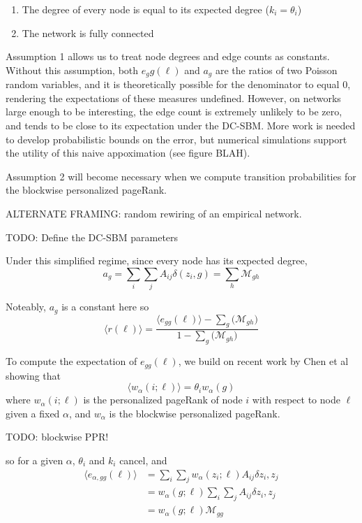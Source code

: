 \documentclass[12pt]{article}
\begin{document}
\begin{enumerate}
  \item The degree of every node is equal to its expected degree ($k_i = \theta_i$)
  \item The network is fully connected
\end{enumerate}

Assumption 1 allows us to treat node degrees and edge counts as constants.  Without this assumption, both $e_gg(\ell)$ and $a_g$ are the ratios of two Poisson random variables, and it is theoretically possible for the denominator to equal 0, rendering the expectations of these measures undefined.  However, on networks large enough to be interesting, the edge count is extremely unlikely to be zero, and tends to be close to its expectation under the DC-SBM.  More work is needed to develop probabilistic bounds on the error, but numerical simulations support the utility of this naive appoximation (see figure BLAH).    

Assumption 2 will become necessary when we compute transition probabilities for the blockwise personalized pageRank. 

ALTERNATE FRAMING: random rewiring of an empirical network.

TODO: Define the DC-SBM parameters

Under this simplified regime, since every node has its expected degree,
\begin{equation}
  a_g = \sum_i \sum_j A_{ij} \delta(z_i, g) = \sum_h \mathcal{M}_{gh}
\end{equation}

Noteably, $a_g$ is a constant here so 
\begin{equation}
  \langle r(\ell) \rangle = \frac{\langle e_{gg}(\ell) \rangle - \sum_g \big( \mathcal{M}_{gh} \big)}{1 - \sum_g \big( \mathcal{M}_{gh} \big)}
\end{equation}

To compute the expectation of $e_{gg}(\ell)$, we build on recent work by Chen et al \cite{chen:2020} showing that
\begin{equation}
  \langle w_\alpha (i ; \ell) \rangle = \theta_i w_\alpha(g)
\end{equation}
where $w_\alpha(i;\ell)$ is the personalized pageRank of node $i$ with respect to node $\ell$ given a fixed $\alpha$, and $w_\alpha$ is the blockwise personalized pageRank.

TODO: blockwise PPR! 

so for a given $\alpha$, $\theta_i$ and $k_i$ cancel, and
\begin{equation}
  \begin{aligned}
    \langle e_{\alpha, gg}(\ell) \rangle &= \sum_i \sum_j w_\alpha(z_i; \ell) A_{ij} \delta{z_i, z_j} \\
    &= w_\alpha(g; \ell) \sum_i \sum_j A_{ij} \delta{z_i, z_j} \\
    &= w_\alpha(g; \ell) \mathcal{M}_{gg}
  \end{aligned}
\end{equation}
\end{document}
